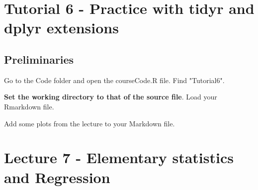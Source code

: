 \documentclass[titlepage]{book}\usepackage{knitr}
\begin{document}







\chapter{Tutorial 6 - Practice with tidyr and dplyr extensions}\label{T6}

\author{Brian Williams $<$\href{mailto:bjw649@gmail.com}%
{bjw649@gmail.com}$>$}

\section{Preliminaries}

Go to the Code folder and open the courseCode.R file.  Find "Tutorial6".

\textbf{Set the working directory to that of the source file}. 
Load your Rmarkdown file.


\begin{knitrout}
\color{fgcolor}\begin{kframe}
\begin{alltt}
\hlstd{(}\hlstd{)}
 \hlkwb{<-} 
\end{alltt}
\end{kframe}
\end{knitrout}

Add some plots from the lecture to your Markdown file.









\chapter{Lecture 7 -  Elementary statistics and Regression}
\end{document}
